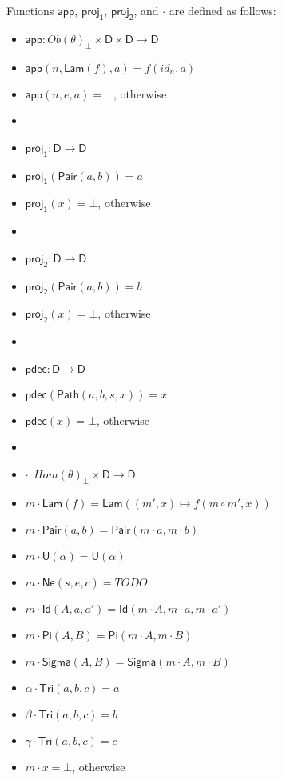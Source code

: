 \documentclass{amsart}
\theoremstyle{definition}
\theoremstyle{remark}
\newcommand{\D}{\mathsf{D}}
\numberwithin{table}{section}
\begin{document}
Functions $\mathsf{app}$, $\mathsf{proj_1}$, $\mathsf{proj_2}$, and $\cdot$ are defined as follows:
\begin{itemize}
\item[] $\mathsf{app} : Ob(\theta)_\bot \times \D \times \D \to \D$
\item[] $\mathsf{app}(n,\mathsf{Lam}(f),a) = f(id_n,a)$
\item[] $\mathsf{app}(n,e,a) = \bot$, otherwise
\item[]
\item[] $\mathsf{proj_1} : \D \to \D$
\item[] $\mathsf{proj_1}(\mathsf{Pair}(a,b)) = a$
\item[] $\mathsf{proj_1}(x) = \bot$, otherwise
\item[]
\item[] $\mathsf{proj_2} : \D \to \D$
\item[] $\mathsf{proj_2}(\mathsf{Pair}(a,b)) = b$
\item[] $\mathsf{proj_2}(x) = \bot$, otherwise
\item[]
\item[] $\mathsf{pdec} : \D \to \D$
\item[] $\mathsf{pdec}(\mathsf{Path}(a,b,s,x)) = x$
\item[] $\mathsf{pdec}(x) = \bot$, otherwise
\item[]
\item[] $\cdot : Hom(\theta)_\bot \times \D \to \D$
\item[] $m \cdot \mathsf{Lam}(f) = \mathsf{Lam}((m',x) \mapsto f(m \circ m', x))$
\item[] $m \cdot \mathsf{Pair}(a, b) = \mathsf{Pair}(m \cdot a, m \cdot b)$
\item[] $m \cdot \mathsf{U}(\alpha) = \mathsf{U}(\alpha)$
\item[] $m \cdot \mathsf{Ne}(s,e,c) = TODO$
\item[] $m \cdot \mathsf{Id}(A, a, a') = \mathsf{Id}(m \cdot A, m \cdot a, m \cdot a')$
\item[] $m \cdot \mathsf{Pi}(A, B) = \mathsf{Pi}(m \cdot A, m \cdot B)$
\item[] $m \cdot \mathsf{Sigma}(A, B) = \mathsf{Sigma}(m \cdot A, m \cdot B)$
\item[] $\alpha \cdot \mathsf{Tri}(a, b, c) = a$
\item[] $\beta \cdot \mathsf{Tri}(a, b, c) = b$
\item[] $\gamma \cdot \mathsf{Tri}(a, b, c) = c$
\item[] $m \cdot x = \bot$, otherwise
\end{itemize}
\end{document}
